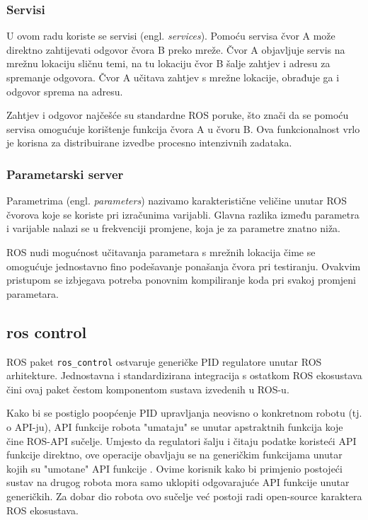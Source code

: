 \documentclass[times, utf8, diplomski, numeric]{fer}
\begin{document}
\subsubsection{Servisi}
U ovom radu koriste se servisi (engl. \textit{services}). 
Pomoću servisa čvor A može direktno zahtijevati odgovor čvora B preko mreže. 
Čvor A objavljuje servis na mrežnu lokaciju sličnu temi, na tu lokaciju čvor B šalje zahtjev i adresu za spremanje odgovora. 
Čvor A učitava zahtjev s mrežne lokacije, obrađuje ga i odgovor sprema na adresu.

Zahtjev i odgovor najčešće su standardne ROS poruke, što znači da se pomoću servisa omogućuje korištenje funkcija čvora A u čvoru B. 
Ova funkcionalnost vrlo je korisna za distribuirane izvedbe procesno intenzivnih zadataka. 

\subsubsection{Parametarski server}
Parametrima (engl. \textit{parameters}) nazivamo karakteristične veličine unutar ROS čvorova koje se koriste pri izračunima varijabli. 
Glavna razlika između parametra i varijable nalazi se u frekvenciji promjene, koja je za parametre znatno niža. 

ROS nudi mogućnost učitavanja parametara s mrežnih lokacija čime se omogućuje jednostavno fino podešavanje ponašanja čvora pri testiranju.
Ovakvim pristupom se izbjegava potreba ponovnim kompiliranje koda pri svakoj promjeni parametara.

\subsection{ros control}
ROS paket \verb|ros_control| ostvaruje generičke PID regulatore unutar ROS arhitekture. 
Jednostavna i standardizirana integracija s ostatkom ROS ekosustava čini ovaj paket čestom komponentom sustava izvedenih u ROS-u.

Kako bi se postiglo poopćenje PID upravljanja neovisno o konkretnom robotu (tj. o API-ju), API funkcije robota "umataju" se unutar apstraktnih funkcija koje čine ROS-API sučelje.
Umjesto da regulatori šalju i čitaju podatke koristeći API funkcije direktno, ove operacije obavljaju se na generičkim funkcijama unutar kojih su "umotane" API funkcije .
Ovime korisnik kako bi primjenio postojeći sustav na drugog robota mora samo uklopiti odgovarajuće API funkcije unutar generičkih.
Za dobar dio robota ovo sučelje već postoji radi open-source karaktera ROS ekosustava.
\end{document}

